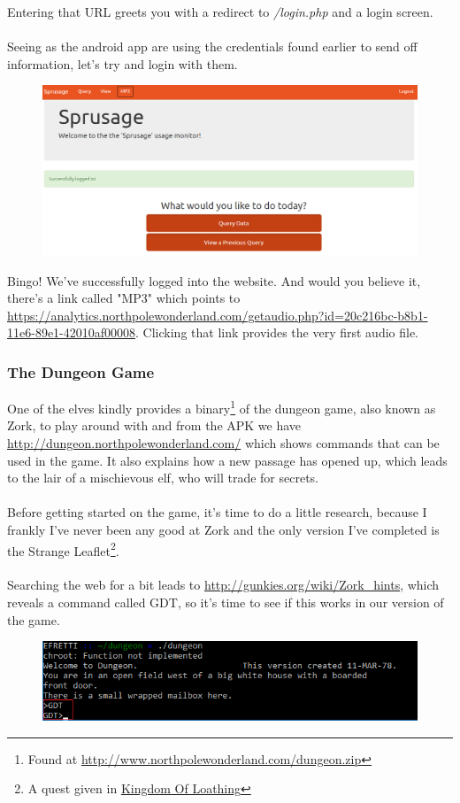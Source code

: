 \documentclass[writeup.tex]{subfiles}
\begin{document}
			Entering that URL greets you with a redirect to \textit{/login.php} and a login screen.\\
			\\
			Seeing as the android app are using the credentials found earlier to send off information, let's try and login with them.\\
			
			\begin{figure}[H]
				\centering
				\includegraphics[width=\linewidth]{"screenshots/pwns/Site 1 - Logged in"}
			\end{figure}
			
			Bingo! We've successfully logged into the website. And would you believe it, there's a link called "MP3" which points to \url{https://analytics.northpolewonderland.com/getaudio.php?id=20c216bc-b8b1-11e6-89e1-42010af00008}. Clicking that link provides the very first audio file.
			
		\subsubsection{The Dungeon Game}
			One of the elves kindly provides a binary\footnote{Found at \url{http://www.northpolewonderland.com/dungeon.zip}} of the dungeon game, also known as Zork, to play around with and from the APK we have \url{http://dungeon.northpolewonderland.com/} which shows commands that can be used in the game. It also explains how a new passage has opened up, which leads to the lair of a mischievous elf, who will trade for secrets.\\
			\\
			Before getting started on the game, it's time to do a little research, because I frankly I've never been any good at Zork and the only version I've completed is the Strange Leaflet\footnote{A quest given in \href{http://www.kingdomofloathing.com}{Kingdom Of Loathing}}.\\
			\\
			Searching the web for a bit leads to \url{http://gunkies.org/wiki/Zork_hints}, which reveals a command called GDT, so it's time to see if this works in our version of the game.
			\begin{figure}[H]
				\centering
				\includegraphics[scale=1]{"screenshots/pwns/Site 2 - init GDT"}
			\end{figure}
			
\end{document}
